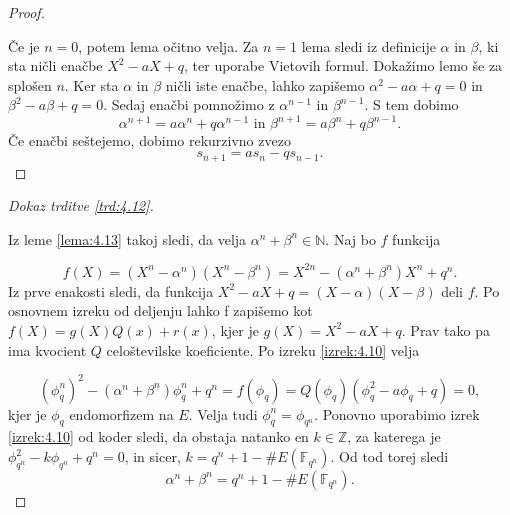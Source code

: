 \documentclass[12pt,a4paper,twoside]{article}
\theoremstyle{definition} %
\theoremstyle{plain} %
\numberwithin{equation}{section}  %
\newcommand{\N}{\mathbb N}
\newcommand{\Z}{\mathbb Z}
\newcommand{\F}{\mathbb F}
\newcommand{\E}[1]{E({#1})}
\begin{document}
\begin{proof}~

Če je $n = 0$, potem lema očitno velja. Za $n=1$ lema sledi iz definicije $\alpha$ in $\beta$, ki sta ničli enačbe $X^2-aX+q$, ter uporabe Vietovih formul. Dokažimo lemo še za splošen $n$.
Ker sta $\alpha$ in $\beta$ ničli iste enačbe, lahko zapišemo $\alpha^2-a\alpha +q = 0$ in $\beta^2-a\beta+q=0$. Sedaj enačbi pomnožimo z $\alpha^{n-1}$ in $\beta^{n-1}$. S tem dobimo
$$\alpha^{n+1} = a\alpha^n +q\alpha^{n-1}\text{ in } \beta^{n+1} = a\beta^n +q\beta^{n-1}.$$
Če enačbi seštejemo, dobimo rekurzivno zvezo
$$s_{n+1} = as_n-qs_{n-1}.$$
\end{proof}

\begin{proof}[Dokaz trditve \ref{trd:4.12}]~

Iz leme \ref{lema:4.13} takoj sledi, da velja $\alpha^n+\beta^n \in \N$. Naj bo $f$ funkcija

$$f(X) = (X^n-\alpha^n)(X^n-\beta^n) = X^{2n}-(\alpha^n+\beta^n)X^n+q^n.$$
Iz prve enakosti sledi, da funkcija $X^2-aX+q = (X-\alpha)(X-\beta)$ deli $f$. Po osnovnem izreku od deljenju lahko f zapišemo kot $f(X) = g(X)Q(x)+r(x)$, kjer je $g(X)= X^2-aX+q$. Prav tako pa ima kvocient $Q$ celoštevilske koeficiente. Po izreku \ref{izrek:4.10} velja

$$(\phi^n_q)^2 -(\alpha^n+\beta^n)\phi^n_q + q^n = f(\phi_q) = Q(\phi_q)(\phi^2_q-a\phi_q+q) = 0,$$
kjer je $\phi_q$ endomorfizem na $E$. Velja tudi $\phi^n_q = \phi_{q^n}$. Ponovno uporabimo izrek \ref{izrek:4.10} od koder sledi, da obstaja natanko en $k \in \Z$, za katerega je
$\phi^2_{q^n}-k\phi_{q^n}+q^n=0$, in sicer, $k = q^n+1-\#\E{\F_{q^n}}$. Od tod torej sledi
$$\alpha^n+\beta^n = q^n+1-\#\E{\F_{q^n}}.$$

\end{proof}
\end{document}
